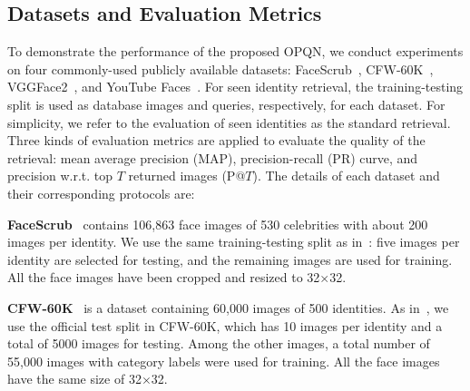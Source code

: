 \documentclass{elsarticle}
\begin{document}
\subsection{Datasets and Evaluation Metrics} \label{datasets}
To demonstrate the performance of the proposed OPQN, we conduct experiments on four commonly-used publicly available datasets: FaceScrub~\cite{ng2014data}, CFW-60K~\cite{li2015two}, VGGFace2~\cite{cao2018vggface2}, and YouTube Faces~\cite{wolf2011face}. For seen identity retrieval, the training-testing split is used as database images and queries, respectively, for each dataset. For simplicity, we refer to the evaluation of seen identities as the standard retrieval. %
Three kinds of evaluation metrics are applied to evaluate the quality of the retrieval: mean average precision (MAP), precision-recall (PR) curve, and precision w.r.t. top $T$ returned images (P@$T$). The details of each dataset and their corresponding protocols are:

\textbf{FaceScrub}~\cite{ng2014data} contains 106,863 face images of 530 celebrities with about 200 images per identity. We use the same training-testing split as in~\cite{lin2017discriminative, tang2018supervised,tang2018discriminative}: five images per identity are selected for testing, and the remaining images are used for training. All the face images have been cropped and resized to 32$\times$32.

\textbf{CFW-60K}~\cite{li2015two} is a dataset containing 60,000 images of 500 identities. As in~\cite{zhang2021deep}, we use the official test split in CFW-60K, which has 10 images per identity and a total of 5000 images for testing. Among the other images, a total number of 55,000 images with category labels were used for training. All the face images have the same size of 32$\times$32. 
\end{document}
